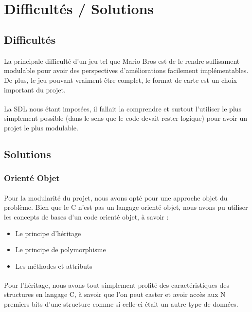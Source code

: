 ﻿\section{Difficultés / Solutions}

\subsection{Difficultés}
\paragraph{} La principale difficulté d'un jeu tel que Mario Bros est de le rendre suffisament modulable pour avoir des perspectives d'améliorations facilement implémentables. De plus, le jeu pouvant vraiment être complet, le format de carte est un choix important du projet.
\paragraph{} La SDL nous étant imposées, il fallait la comprendre et surtout l'utiliser le plus simplement possible (dans le sens que le code devait rester logique) pour avoir un projet le plus modulable.

\subsection{Solutions}
\subsubsection{Orienté Objet}

\paragraph{} Pour la modularité du projet, nous avons opté pour une approche objet du problème. Bien que le C n'est pas un langage orienté objet, nous avons pu utiliser les concepts de bases d'un code orienté objet, à savoir :
\begin{itemize}
	\item Le principe d'héritage
	\item Le principe de polymorphisme
	\item Les méthodes et attributs
\end{itemize}

\paragraph{} Pour l'héritage, nous avons tout simplement profité des caractéristiques des structures en langage C, à savoir que l'on peut caster et avoir accès aux N premiers bits d'une structure comme si celle-ci était un autre type de données.
